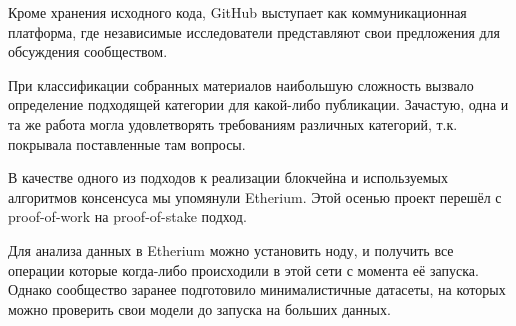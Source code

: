 \documentclass[a4paper, 12pt]{report}		%
\begin{document}
Кроме хранения исходного кода, GitHub выступает как коммуникационная платформа, где независимые исследователи представляют свои предложения для обсуждения сообществом.

При классификации собранных материалов наибольшую сложность вызвало определение подходящей категории для какой-либо публикации. Зачастую, одна и та же работа могла удовлетворять требованиям различных категорий, т.к. покрывала поставленные там вопросы.

В качестве одного из подходов к реализации блокчейна и используемых алгоритмов консенсуса мы упомянули Etherium. Этой осенью проект перешёл с proof-of-work на proof-of-stake подход.

Для анализа данных в Etherium можно установить ноду, и получить все операции которые когда-либо происходили в этой сети с момента её запуска. Однако сообщество заранее подготовило минималистичные датасеты, на которых можно проверить свои модели до запуска на больших данных.
\end{document}
